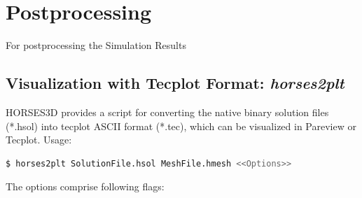 \documentclass[a4paper,10pt]{report}
\begin{document}

% 






\chapter{Postprocessing}

For postprocessing the Simulation Results

\section{Visualization with Tecplot Format: \textit{horses2plt}}\label{sect.convertTec}

HORSES3D provides a script for converting the native binary solution files (*.hsol) into tecplot ASCII format (*.tec), which can be visualized in Pareview or Tecplot. Usage:

\begin{lstlisting}[language=bash]
	$ horses2plt SolutionFile.hsol MeshFile.hmesh <<Options>>
\end{lstlisting}

The options comprise following flags:
\end{document}
